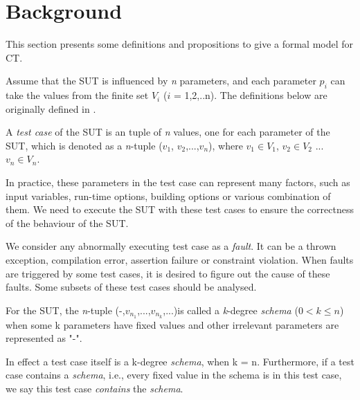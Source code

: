 \documentclass{sig-alternate}
\begin{document}
\section{Background}
This section presents some definitions and propositions to give a formal model for CT.


Assume that the SUT is influenced by \emph{n} parameters, and each parameter $p_{i}$ can take the values from the finite set $V_{i}$ ($i$ = 1,2,..n). The definitions below are originally defined in \cite{nie2011minimal}.

\begin{definition}
A \emph{test case} of the SUT is an tuple of \emph{n} values, one for each parameter of the SUT, which is denoted as a \emph{n}-tuple ($v_{1}$, $v_{2}$,...,$v_{n}$), where $v_{1}\in V_{1}$, $v_{2} \in V_{2}$ ... $v_{n} \in V_{n}$.
\end{definition}

In practice, these parameters in the test case can represent many factors, such as input variables, run-time options, building options or various combination of them. We need to execute the SUT with these test cases to ensure the correctness of the behaviour of the SUT.

We consider any abnormally executing test case as a \emph{fault}. It can be a thrown exception, compilation error, assertion failure or constraint violation. When faults are triggered by some test cases, it is desired to figure out the cause of these faults. Some subsets of these test cases should be analysed.


\begin{definition}
For the SUT, the \emph{n}-tuple (-,$v_{n_{1}}$,...,$v_{n_{k}}$,...)is called a \emph{k}-degree \emph{schema} ($0 < k \leq n $) when some k parameters have fixed values and other irrelevant parameters are represented as "-".

In effect a test case itself is a k-degree \emph{schema}, when k = n. Furthermore, if a test case contains a \emph{schema}, i.e., every fixed value in the schema is in this test case, we say this test case \emph{contains} the \emph{schema}.
\end{definition}
\end{document}
